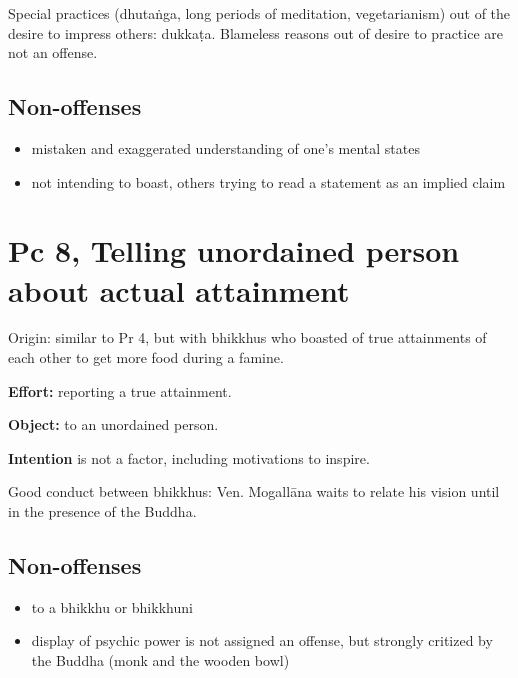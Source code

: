 Special practices (dhutaṅga, long periods of meditation, vegetarianism)
out of the desire to impress others: dukkaṭa. Blameless reasons out of
desire to practice are not an offense.

\subsection{Non-offenses}

\begin{itemize}
\tightlist
\item
  mistaken and exaggerated understanding of one's mental states
\item
  not intending to boast, others trying to read a statement as an
  implied claim
\end{itemize}

\section{Pc 8, Telling unordained person about actual attainment}

Origin: similar to Pr 4, but with bhikkhus who boasted of true
attainments of each other to get more food during a famine.

\textbf{Effort:} reporting a true attainment.

\textbf{Object:} to an unordained person.

\textbf{Intention} is not a factor, including motivations to inspire.

Good conduct between bhikkhus: Ven. Mogallāna waits to relate his vision
until in the presence of the Buddha.

\subsection{Non-offenses}

\begin{itemize}
\tightlist
\item
  to a bhikkhu or bhikkhuni
\item
  display of psychic power is not assigned an offense, but strongly
  critized by the Buddha (monk and the wooden bowl)
\end{itemize}

